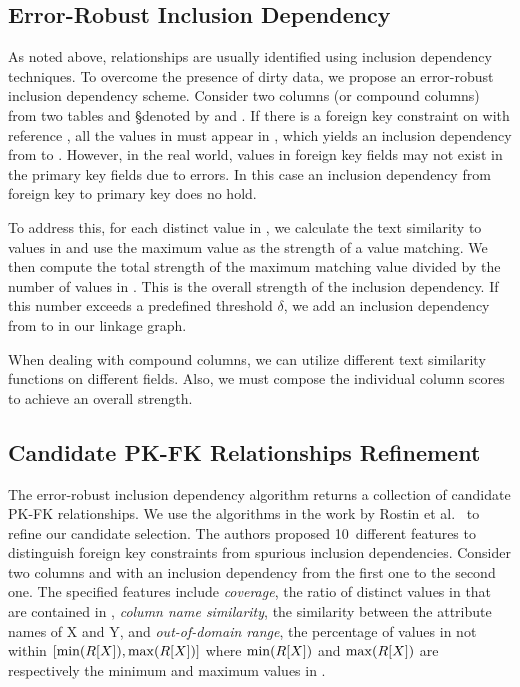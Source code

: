 \subsection{Error-Robust Inclusion Dependency}\label{subsec:eind}

As noted above, \pkfk relationships are usually identified using inclusion
dependency techniques. To overcome the presence of dirty data, we propose an
error-robust inclusion dependency scheme.
Consider two columns (or compound columns) from two tables \R and \S denoted by
\RX and \SY. If there is a foreign key constraint on \RX with reference \SY, all
the values in \RX must appear in \SY, which yields an inclusion dependency from
\RX to \SY. However, in the real world, values in foreign key fields may not
exist in the primary key fields due to errors.  In this case an inclusion
dependency from foreign key to primary key does no hold.

To address this, for each distinct value in \RX, we calculate the
text similarity to values in \SY and use the maximum value as the strength of a
value matching. We then compute the total strength of the maximum matching value
divided by the number of values in \RX. This is the overall strength of the
inclusion dependency.  If this number exceeds a predefined threshold $\delta$,
we add an inclusion dependency from \RX to \SY in our linkage graph.

When dealing with compound columns, we can utilize different text similarity functions on different fields. 
Also, we must compose the individual column scores to achieve an overall strength.


\subsection{Candidate PK-FK Relationships Refinement}
\label{subsec:refine}


The error-robust inclusion dependency algorithm returns a collection of candidate PK-FK relationships.
We use the algorithms in the work by Rostin et al.~\cite{DBLP:conf/webdb/RostinABNL09} 
to refine our candidate selection. The authors proposed 10~different features to distinguish foreign key constraints from spurious inclusion dependencies. Consider two columns \RX and \SY with an inclusion dependency from the first one to the second one. 
The specified features include 
\emph{coverage}, the ratio of distinct values in \RX that are contained in \SY, 
\emph{column name similarity}, the similarity between the attribute names of X and Y, 
and \emph{out-of-domain range}, the percentage of values in \SY not within $[\min(R[X]), \max(R[X])]$ where $\min(R[X])$ and $\max(R[X])$ are respectively the minimum and maximum values in \RX.

